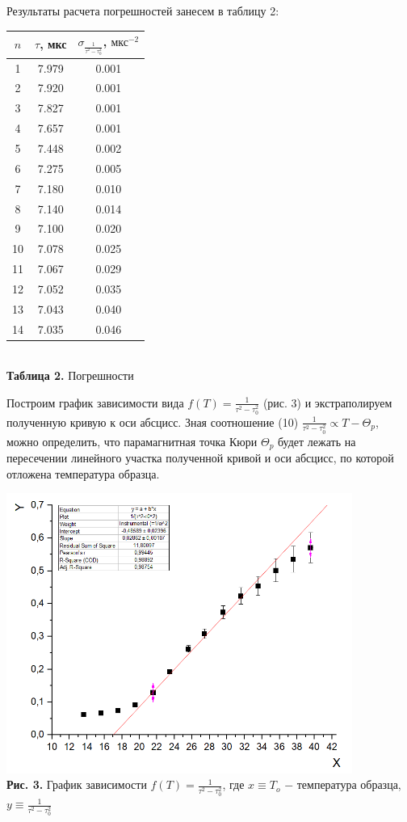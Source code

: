 \documentclass[a4paper,12pt]{article} %
\begin{document}
\hfill \break Результаты расчета погрешностей занесем в таблицу 2:

\begin{center}
\begin{tabular}{|c|c|c|}\hline
$ n $ & $ \tau $, мкс & $ \sigma_{\frac{1}{\tau^2 - \tau_{0}^2}} $, $\text{мкс}^{-2} $ \\\hline
1 & 7.979 & 0.001 \\\hline
2 & 7.920 & 0.001 \\\hline
3 & 7.827 & 0.001 \\\hline
4 & 7.657 & 0.001 \\\hline
5 & 7.448 & 0.002 \\\hline
6 & 7.275 & 0.005 \\\hline
7 & 7.180 & 0.010 \\\hline
8 & 7.140 & 0.014 \\\hline
9 & 7.100 & 0.020 \\\hline
10 & 7.078 & 0.025 \\\hline
11 & 7.067 & 0.029 \\\hline
12 & 7.052 & 0.035 \\\hline
13 & 7.043 & 0.040 \\\hline
14 & 7.035 & 0.046 \\\hline
\end{tabular} \\
\hfill \break \textbf {Таблица 2.} Погрешности\\
\end{center}

\hfill \break Построим график зависимости вида $f(T) = \frac{1}{\tau^2 - \tau_{0}^2}$ (рис. 3) и экстраполируем полученную кривую к оси абсцисс. Зная соотношение (10) $\frac{1}{\tau^2 - \tau_{0}^2} \propto T - \Theta_{p}$, можно определить, что парамагнитная точка Кюри $\Theta_{p}$ будет лежать на пересечении линейного участка полученной кривой и оси абсцисс, по которой отложена температура образца.

\begin{center}
\includegraphics[width=0.85\textwidth]{3.4.2_3.png}\\
\textbf{Рис. 3.} График зависимости $f(T) = \frac{1}{\tau^2 - \tau_{0}^2}$, где $x \equiv T_{o}$ $-$ температура образца, $y \equiv \frac{1}{\tau^2 - \tau_{0}^2}$\\
\end{center}
\end{document}
